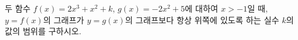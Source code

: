두 함수 $f(x)=2x^3+x^2+k$, $g(x)=-2x^2+5$에 대하여 $x>-1$일 때, $y=f(x)$의 그래프가 $y=g(x)$의 그래프보다 항상 위쪽에 있도록 하는 실수 $k$의 값의 범위를 구하시오.
